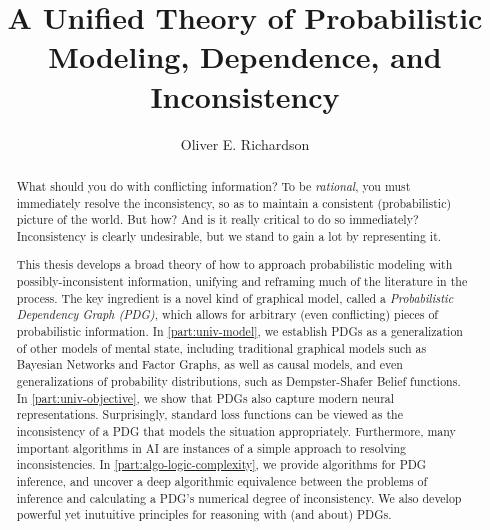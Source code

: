 \documentclass[tocprelim,
    ]{cornellmodified}
\title {%
    A Unified Theory of Probabilistic Modeling, Dependence, and Inconsistency
}
\author {Oliver E. Richardson}
\begin{document}
\maketitle
\makecopyright

\begin{abstract}
%

What should you do with conflicting information?
To be \emph{rational}, you must immediately resolve the inconsistency,
    so as to maintain a consistent (probabilistic) picture of the world.
%
But how?
And is it really critical to do so immediately?
Inconsistency is clearly undesirable, but we stand to gain a lot by representing it.
%

This thesis develops a broad theory of how to approach probabilistic modeling with possibly-inconsistent information, unifying and reframing much of the literature in the process.  
The key ingredient is a novel kind of graphical model, called a \emph{Probabilistic Dependency Graph (PDG)},
which allows for arbitrary (even conflicting) pieces of probabilistic information. 
In \cref{part:univ-model}, we establish PDGs as a generalization of other models of mental state, including traditional graphical models such as Bayesian Networks and Factor Graphs, as well as causal models, and even generalizations of probability distributions, such as Dempster-Shafer Belief functions. 
In \cref{part:univ-objective}, we show that PDGs also capture modern neural representations.
Surprisingly, standard loss functions can be viewed as the inconsistency of a PDG that models the situation appropriately. 
Furthermore, many important algorithms in AI are instances of a simple approach to resolving inconsistencies. 
In \cref{part:algo-logic-complexity}, we provide algorithms for PDG inference, and uncover a deep algorithmic equivalence between the problems of inference and calculating a PDG's numerical degree of inconsistency. 
We also develop powerful yet inutuitive principles for reasoning with (and about) PDGs. 
\end{abstract}
\end{document}
